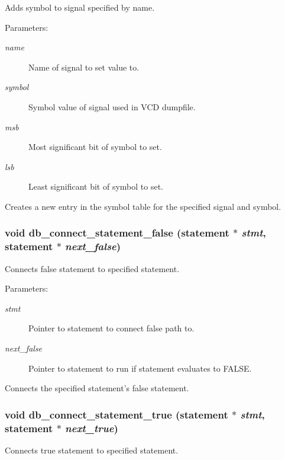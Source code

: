 Adds symbol to signal specified by name. 

\begin{Desc}
\item[Parameters:]
\begin{description}
\item[{\em name}]Name of signal to set value to. \item[{\em symbol}]Symbol value of signal used in VCD dumpfile. \item[{\em msb}]Most significant bit of symbol to set. \item[{\em lsb}]Least significant bit of symbol to set.\end{description}
\end{Desc}
Creates a new entry in the symbol table for the specified signal and symbol. 
\subsubsection{\setlength{\rightskip}{0pt plus 5cm}void db\_\-connect\_\-statement\_\-false ({\bf statement} $\ast$ {\em stmt}, {\bf statement} $\ast$ {\em next\_\-false})}\label{db_8h_a19}


Connects false statement to specified statement. 

\begin{Desc}
\item[Parameters:]
\begin{description}
\item[{\em stmt}]Pointer to statement to connect false path to. \item[{\em next\_\-false}]Pointer to statement to run if statement evaluates to FALSE.\end{description}
\end{Desc}
Connects the specified statement's false statement. 
\subsubsection{\setlength{\rightskip}{0pt plus 5cm}void db\_\-connect\_\-statement\_\-true ({\bf statement} $\ast$ {\em stmt}, {\bf statement} $\ast$ {\em next\_\-true})}\label{db_8h_a18}


Connects true statement to specified statement. 

